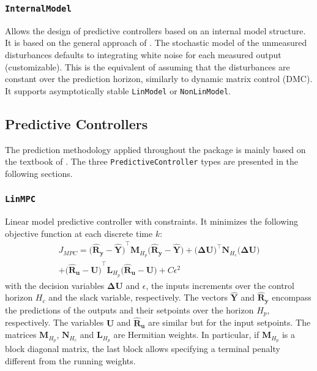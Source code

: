 \subsubsection{\textnormal{\texttt{InternalModel}}}
Allows the design of predictive controllers based on an internal model structure. It is based on the general approach of \citet{globPC}. The stochastic model of the unmeasured disturbances defaults to integrating white noise for each measured output (customizable). This is the equivalent of assuming that the disturbances are constant over the prediction horizon, similarly to dynamic matrix control (DMC). It supports asymptotically stable \texttt{LinModel} or \texttt{NonLinModel}.

\subsection{Predictive Controllers}

The prediction methodology applied throughout the package is mainly based on the textbook of \citet{mpcMac}. The three \texttt{PredictiveController} types are presented in the following sections.

\subsubsection{\textnormal{\texttt{LinMPC}}}
Linear model predictive controller with constraints. It minimizes the following objective function at each discrete time $k$:
\begin{multline}\label{eq:J_MPC}
J_{\mathit{MPC}} = 
    \mathbf{\big(\hat{R}_y - \hat{Y}\big)}^\intercal \mathbf{M}_{H_p} \mathbf{\big(\hat{R}_y - \hat{Y}\big)}   
    + \mathbf{\big(ΔU\big)}^\intercal \mathbf{N}_{H_c} \mathbf{\big(ΔU\big)} \\
    + \mathbf{\big(\hat{R}_u - U\big)}^\intercal \mathbf{L}_{H_p} \mathbf{\big(\hat{R}_u - U\big)} 
    + C \epsilon^2
\end{multline}
with the decision variables $\mathbf{ΔU}$ and $\epsilon$, the inputs increments over the control horizon $H_c$ and the slack variable, respectively. The vectors $\mathbf{\hat{Y}}$ and $\mathbf{\hat{R}_y}$ encompass the predictions of the outputs and their setpoints over the horizon $H_p$, respectively. The variables $\mathbf{U}$ and $\mathbf{\hat{R}_u}$ are similar but for the input setpoints. The matrices $\mathbf{M}_{H_p}$, $\mathbf{N}_{H_c}$ and $\mathbf{L}_{H_p}$ are Hermitian weights. In particular, if $\mathbf{M}_{H_p}$ is a block diagonal matrix, the last block allows specifying a terminal penalty different from the running weights.

